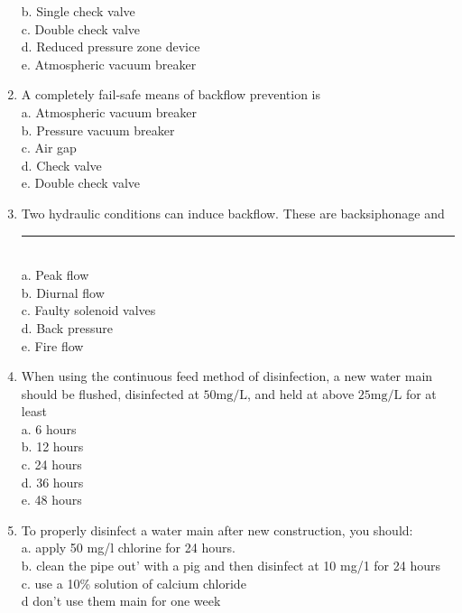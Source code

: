\documentclass{article}
\begin{document}
\begin{enumerate}[1.]
b. Single check valve\\

c. Double check valve\\

d. Reduced pressure zone device\\

e. Atmospheric vacuum breaker\\


  \item A completely fail-safe means of backflow prevention is\\
a. Atmospheric vacuum breaker\\
b. Pressure vacuum breaker\\
c. Air gap\\
d. Check valve\\
e. Double check valve\\

  \item Two hydraulic conditions can induce backflow. These are backsiphonage and \rule{2cm}{0.3pt}\\
a. Peak flow\\
b. Diurnal flow\\
c. Faulty solenoid valves\\
d. Back pressure\\
e. Fire flow\\

\item When using the continuous feed method of disinfection, a new water main should be flushed, disinfected at $50 \mathrm{mg} / \mathrm{L}$, and held at above $25 \mathrm{mg} / \mathrm{L}$ for at least\\
a. 6 hours\\
b. 12 hours\\
c. 24 hours\\
d. 36  hours\\
e. 48 hours\\

\item To properly disinfect a water main after new construction, you should:\\
a.	 apply 50 mg/l chlorine for 24 hours.\\
b. 	clean the pipe out' with a pig and then disinfect at 10 mg/1 for 24 hours\\
c.	use a 10\% solution of calcium chloride \\
d	 don't use them main for one week\\


\end{enumerate}
\end{document}

